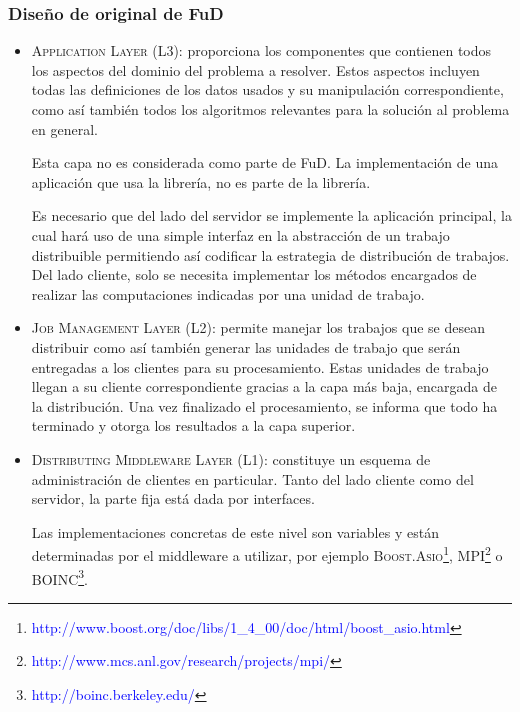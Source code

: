 \documentclass[12pt,a4paper,spanish]{article}
\begin{document}
		\subsubsection{Diseño de original de FuD}	
		\begin{itemize}
			\item \textsc{Application Layer (L3):} proporciona los componentes que contienen todos los aspectos del 			dominio del problema a resolver. Estos aspectos incluyen todas las definiciones de los datos usados y su 				manipulación correspondiente, como así también todos los algoritmos relevantes para la solución al problema en 				general. 
			\par Esta capa no es considerada como parte de FuD. La implementación de una aplicación que usa la 				librería, no es parte de la librería.
			\par Es necesario que del lado del servidor se implemente la aplicación principal, la cual hará uso de 				una simple interfaz en la abstracción de un trabajo distribuible permitiendo así codificar la estrategia de 			distribución de trabajos. Del lado cliente, solo se necesita implementar los métodos encargados de realizar 			las computaciones indicadas por una unidad de trabajo.

			\item \textsc{Job Management Layer (L2):} permite manejar los trabajos que se desean distribuir como así 				también generar las unidades de trabajo que serán entregadas a los clientes para su procesamiento. Estas 				unidades de trabajo llegan a su cliente correspondiente gracias a la capa más baja, encargada de la 			distribución. Una vez finalizado el procesamiento, se informa que todo ha terminado y otorga los resultados a 				la capa superior.

			\item \textsc{Distributing Middleware Layer (L1):} constituye un esquema de administración de clientes en 				particular. Tanto del lado cliente como del servidor, la parte fija está dada por interfaces.	
			\par Las implementaciones concretas de este nivel son variables y están determinadas por el middleware a 				utilizar, por ejemplo \textsc{Boost.Asio}\footnote{\textcolor{blue}{http://www.boost.org/doc/libs/1\_4\_00/doc/html/boost\_asio.html}}, \textsc{MPI}\footnote{\textcolor{blue}{http://www.mcs.anl.gov/research/projects/mpi/}} o 
			\textsc{BOINC}\footnote{\textcolor{blue}{http://boinc.berkeley.edu/}}. 
		\end{itemize}			
\end{document}
